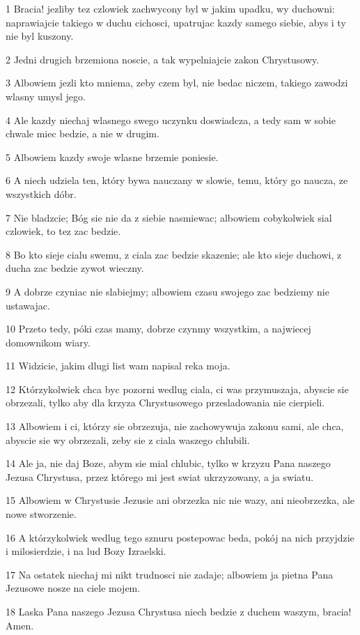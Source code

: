 \par 1 Bracia! jezliby tez czlowiek zachwycony byl w jakim upadku, wy duchowni: naprawiajcie takiego w duchu cichosci, upatrujac kazdy samego siebie, abys i ty nie byl kuszony.
\par 2 Jedni drugich brzemiona noscie, a tak wypelniajcie zakon Chrystusowy.
\par 3 Albowiem jezli kto mniema, zeby czem byl, nie bedac niczem, takiego zawodzi wlasny umysl jego.
\par 4 Ale kazdy niechaj wlasnego swego uczynku doswiadcza, a tedy sam w sobie chwale miec bedzie, a nie w drugim.
\par 5 Albowiem kazdy swoje wlasne brzemie poniesie.
\par 6 A niech udziela ten, który bywa nauczany w slowie, temu, który go naucza, ze wszystkich dóbr.
\par 7 Nie bladzcie; Bóg sie nie da z siebie nasmiewac; albowiem cobykolwiek sial czlowiek, to tez zac bedzie.
\par 8 Bo kto sieje cialu swemu, z ciala zac bedzie skazenie; ale kto sieje duchowi, z ducha zac bedzie zywot wieczny.
\par 9 A dobrze czyniac nie slabiejmy; albowiem czasu swojego zac bedziemy nie ustawajac.
\par 10 Przeto tedy, póki czas mamy, dobrze czynmy wszystkim, a najwiecej domownikom wiary.
\par 11 Widzicie, jakim dlugi list wam napisal reka moja.
\par 12 Którzykolwiek chca byc pozorni wedlug ciala, ci was przymuszaja, abyscie sie obrzezali, tylko aby dla krzyza Chrystusowego przesladowania nie cierpieli.
\par 13 Albowiem i ci, którzy sie obrzezuja, nie zachowywuja zakonu sami, ale chca, abyscie sie wy obrzezali, zeby sie z ciala waszego chlubili.
\par 14 Ale ja, nie daj Boze, abym sie mial chlubic, tylko w krzyzu Pana naszego Jezusa Chrystusa, przez którego mi jest swiat ukrzyzowany, a ja swiatu.
\par 15 Albowiem w Chrystusie Jezusie ani obrzezka nic nie wazy, ani nieobrzezka, ale nowe stworzenie.
\par 16 A którzykolwiek wedlug tego sznuru postepowac beda, pokój na nich przyjdzie i milosierdzie, i na lud Bozy Izraelski.
\par 17 Na ostatek niechaj mi nikt trudnosci nie zadaje; albowiem ja pietna Pana Jezusowe nosze na ciele mojem.
\par 18 Laska Pana naszego Jezusa Chrystusa niech bedzie z duchem waszym, bracia! Amen.


